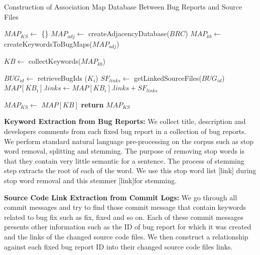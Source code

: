 \documentclass[conference]{IEEEtran}
\begin{document}
\begin{algorithm}[!t]
	\caption{Construction of Association Map Database Between Bug Reports and Source Files}
	\label{map}
	\begin{algorithmic}[1]
		\State $MAP_{KS} \gets$ \{\}
		\State $MAP_{adj} \gets$ createAdjacencyDatabase($BRC$)
		\State $MAP_{kb} \gets$ createKeywordsToBugMaps($MAP_{adj}$)
		
		\State $KB \gets$ collectKeywords($MAP_{kb}$)
		
		\State $BUG_{id} \gets$ retrieveBugIds ($K_i$)
		\State $SF_{links} \gets$ getLinkedSourceFiles($BUG_{id}$)
		\State $MAP[KB_i].links \gets MAP[KB_{i}].links + SF_{links}$
		\EndFor
		\EndFor
		
		\State $MAP_{KS} \gets$ $MAP[KB]$ 
		\State \textbf{return} $MAP_{KS}$
		\EndProcedure
	\end{algorithmic}
\end{algorithm}



\textbf{Keyword Extraction from Bug Reports:} We collect title, description and developers comments from each fixed bug report in a collection of bug reports. We perform standard natural language pre-processing on the corpus such as stop word removal, splitting and stemming. The purpose of removing stop words is that they contain very little semantic for a sentence. The process of stemming step extracts the root of each of the word. We use this stop word list [link] during stop word removal and this stemmer [link]for stemming. 

\textbf{Source Code Link Extraction from Commit Logs:}
We go through all commit messages and try to find those commit message that contain keywords related to bug fix such as fix, fixed and so on. Each of these commit messages presents other information such as the ID of bug report for which it was created and the links of the changed source code files. We then construct a relationship against each fixed bug report ID into their changed source code files links.
\end{document}
